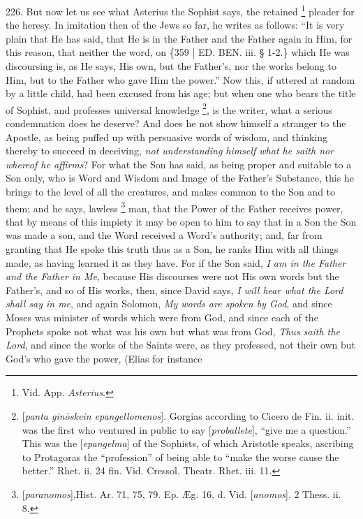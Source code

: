 226.
But now let us see what Asterius the Sophist says, the retained \footnote{Vid. App. \emph{Asterius}.} pleader for the heresy. In imitation then of the Jews so far,
he writes as follows: ``It is very plain that He has said, that He is
in the Father and the Father again in Him, for this reason, that
neither the word, on \{359 | ED.
BEN. iii. § 1-2.\} which He was discoursing is,
as He says, His own, but the Father's, nor the works belong to Him,
but to the Father who gave Him the power.'' Now this, if uttered at
random by a little child, had been excused from his age; but when one
who bears the title of Sophist, and professes universal knowledge \footnote{[\emph{panta gin\={o}skein epangellomenos}]. Gorgias according to Cicero
de Fin. ii. init. was the first who ventured in public to say [\emph{proballete}],
``give me a question.'' This was the [\emph{epangelma}] of the
Sophists, of which Aristotle speaks, ascribing to Protagoras the ``profession''
of being able to ``make the worse cause the better.'' Rhet. ii. 24 fin.
Vid. Cressol. Theatr. Rhet. iii. 11.}, is the writer, what a serious condemnation does he deserve?
And does he not show himself a stranger to the Apostle, as being
puffed up with persuasive words of wisdom, and thinking thereby to
succeed in deceiving, \emph{not understanding himself what he saith nor
whereof he affirms}? For what the Son has said, as being proper and
suitable to a Son only, who is Word and Wisdom and Image of the Father's
Substance, this he brings to the level of all the creatures, and makes
common to the Son and to them; and he says, lawless \footnote{[\emph{paranomos}],\emph{}Hist. Ar. 71, 75, 79. Ep. Æg. 16, d. Vid.
[\emph{anomos}], 2 Thess. ii. 8.} man, that the Power of the Father receives power, that by means
of this impiety it may be open to him to say that in a Son the Son was
made a son, and the Word received a Word's authority; and, far from
granting that He spoke this truth thus as a Son, he ranks Him with all
things made, as having learned it as they have. For if the Son said, \emph{I
am in the Father and the Father in Me}, because His discourses were
not His own words but the Father's, and so of His works, then, since
David says, \emph{I will hear what the Lord shall say in me}, and
again Solomon, \emph{My words are spoken by God}, and since Moses was
minister of words which were from God, and since each of the Prophets
spoke not what was his own but what was from God, \emph{Thus saith the
Lord}, and since the works of the Saints were, as they professed,
not their own but God's who gave the power, (Elias for instance

